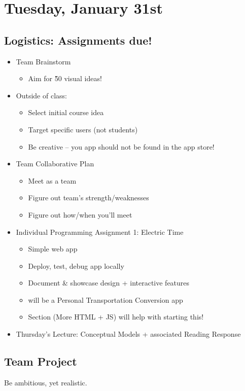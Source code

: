 \section{Tuesday, January 31st}
\subsection{Logistics: Assignments due!}
\begin{itemize}
    \item Team Brainstorm
    \begin{itemize}
        \item Aim for \~50 visual ideas!
    \end{itemize}
    \item Outside of class:
    \begin{itemize}
        \item Select initial course idea
        \item Target specific users (not students)
        \item Be creative -- you app should not be found in the app store!
    \end{itemize}
    \item Team Collaborative Plan
    \begin{itemize}
        \item Meet as a team
        \item Figure out team's strength/weaknesses
        \item Figure out how/when you'll meet
    \end{itemize}
    \item Individual Programming Assignment 1: Electric Time
    \begin{itemize}
        \item Simple web app
        \item Deploy, test, debug app locally
        \item Document \& showcase design + interactive features
        \item will be a Personal Transportation Conversion app
        \item Section (More HTML + JS) will help with starting this!
    \end{itemize}
    \item Thursday's Lecture: Conceptual Models + associated Reading Response
\end{itemize}

\subsection{Team Project}
\begin{shaded}
Be ambitious, yet realistic.
\end{shaded}
